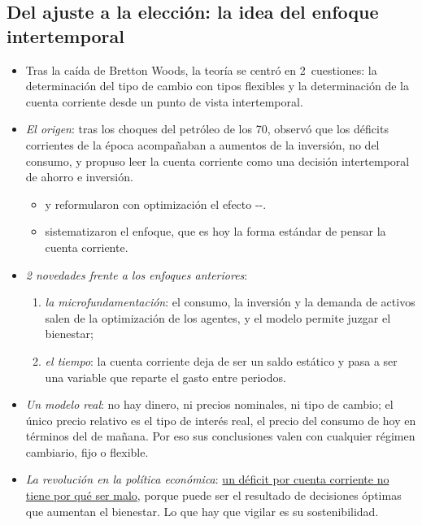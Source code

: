 \documentclass[11pt]{article}
\begin{document}
\subsection{Del ajuste a la elección: la idea del enfoque intertemporal}\label{sec:intertemporal-idea}

\begin{itemize}
\item Tras la caída de Bretton Woods, la teoría se centró en 2~cuestiones: la determinación del tipo de cambio con tipos flexibles  y la determinación de la cuenta corriente desde un punto de vista intertemporal.
\item \emph{El origen}: tras los choques del petróleo de los 70, \textcite{Sachs1981} observó que los déficits corrientes de la época acompañaban a aumentos de la inversión, no del consumo, y propuso leer la cuenta corriente como una decisión intertemporal de ahorro e inversión.
  \begin{itemize}
  \item \textcite{Obstfeld1982Aggregate} y \textcite{SvenssonRazin1983} reformularon con optimización el efecto --.
  \item \textcite{ObstfeldRogoff1995Intertemporal,ObstfeldRogoff1996Foundations} sistematizaron el enfoque, que es hoy la forma estándar de pensar la cuenta corriente\nocite{Gandolfo2016International}.
  \end{itemize}
\item \emph{2 novedades frente a los enfoques anteriores}:
  \begin{enumerate}
  \item \emph{la microfundamentación}: el consumo, la inversión y la demanda de activos salen de la optimización de los agentes, y el modelo permite juzgar el bienestar;
  \item \emph{el tiempo}: la cuenta corriente deja de ser un saldo estático y pasa a ser una variable que reparte el gasto entre periodos.
  \end{enumerate}
\item \emph{Un modelo real}: no hay dinero, ni precios nominales, ni tipo de cambio; el único precio relativo es el tipo de interés real, el precio del consumo de hoy en términos del de mañana. Por eso sus conclusiones valen con cualquier régimen cambiario, fijo o flexible.
\item \emph{La revolución en la política económica}: \uline{un déficit por cuenta corriente no tiene por qué ser malo}, porque puede ser el resultado de decisiones óptimas que aumentan el bienestar. Lo que hay que vigilar es su sostenibilidad.
\end{itemize}
\end{document}
